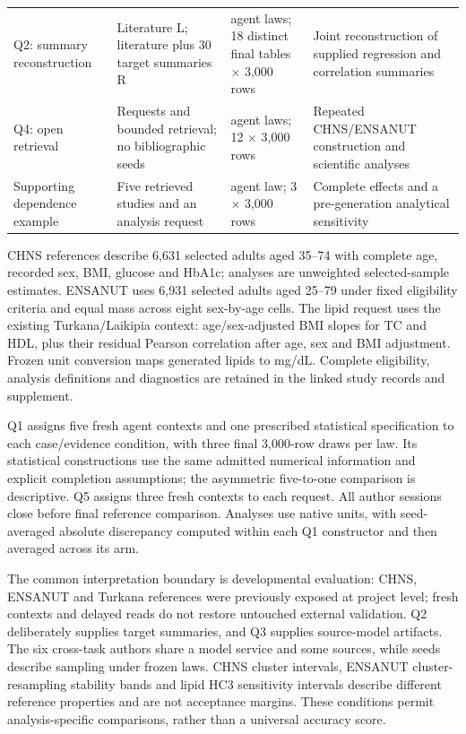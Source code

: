\documentclass[sigconf,anonymous,review]{acmart}
\begin{document}
\begin{table}[tp]
\begin{tabularx}{\textwidth}{@{}>{\raggedright\arraybackslash}X>{\raggedright\arraybackslash}X>{\raggedright\arraybackslash}X>{\raggedright\arraybackslash}X@{}}
Q2: summary reconstruction & Literature L; literature plus 30 target summaries R & 6 agent laws; 18 distinct final tables × 3,000 rows & Joint reconstruction of supplied regression and correlation summaries \\

Q4: open retrieval & Requests and bounded retrieval; no bibliographic seeds & 4 agent laws; 12 × 3,000 rows & Repeated CHNS/\allowbreak{}ENSANUT construction and scientific analyses \\

Supporting dependence example & Five retrieved studies and an analysis request & 1 agent law; 3 × 3,000 rows & Complete effects and a pre-generation analytical sensitivity \\

\bottomrule

\end{tabularx}

\end{table}

CHNS references describe 6,631 selected adults aged 35–\allowbreak{}74 with complete age, recorded sex, BMI, glucose and HbA1c; analyses are unweighted selected-sample estimates. ENSANUT uses 6,931 selected adults aged 25–\allowbreak{}79 under fixed eligibility criteria and equal mass across eight sex-by-age cells. The lipid request uses the existing Turkana/\allowbreak{}Laikipia context: age/\allowbreak{}sex-adjusted BMI slopes for TC and HDL, plus their residual Pearson correlation after age, sex and BMI adjustment. Frozen unit conversion maps generated lipids to mg/\allowbreak{}dL. Complete eligibility, analysis definitions and diagnostics are retained in the linked study records and supplement.


Q1 assigns five fresh agent contexts and one prescribed statistical specification to each case/\allowbreak{}evidence condition, with three final 3,000-row draws per law. Its statistical constructions use the same admitted numerical information and explicit completion assumptions; the asymmetric five-to-one comparison is descriptive. Q5 assigns three fresh contexts to each request. All author sessions close before final reference comparison. Analyses use native units, with seed-averaged absolute discrepancy computed within each Q1 constructor and then averaged across its arm.


The common interpretation boundary is developmental evaluation: CHNS, ENSANUT and Turkana references were previously exposed at project level; fresh contexts and delayed reads do not restore untouched external validation. Q2 deliberately supplies target summaries, and Q3 supplies source-model artifacts. The six cross-task authors share a model service and some sources, while seeds describe sampling under frozen laws. CHNS cluster intervals, ENSANUT cluster-resampling stability bands and lipid HC3 sensitivity intervals describe different reference properties and are not acceptance margins. These conditions permit analysis-specific comparisons, rather than a universal accuracy score.
\end{document}
